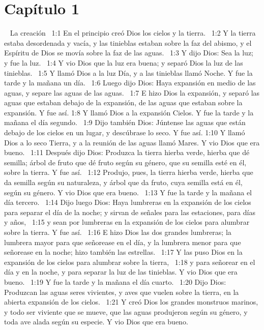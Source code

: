 \section*{Capítulo 1}





 
La creación  
1:1 En el principio creó Dios los cielos y la tierra.  
1:2 Y la tierra estaba desordenada y vacía, y las tinieblas estaban sobre la faz del abismo, y el Espíritu de Dios se movía sobre la faz de las aguas.  
1:3 Y dijo Dios: Sea la luz;  y fue la luz.  
1:4 Y vio Dios que la luz era buena; y separó Dios la luz de las tinieblas.  
1:5 Y llamó Dios a la luz Día, y a las tinieblas llamó Noche. Y fue la tarde y la mañana un día.  
1:6 Luego dijo Dios: Haya expansión en medio de las aguas, y separe las aguas de las aguas.  
1:7 E hizo Dios la expansión, y separó las aguas que estaban debajo de la expansión, de las aguas que estaban sobre la expansión. Y fue así. 
1:8 Y llamó Dios a la expansión Cielos. Y fue la tarde y la mañana el día segundo.  
1:9 Dijo también Dios: Júntense las aguas que están debajo de los cielos en un lugar, y descúbrase lo seco. Y fue así. 
1:10 Y llamó Dios a lo seco Tierra, y a la reunión de las aguas llamó Mares. Y vio Dios que era bueno.  
1:11 Después dijo Dios: Produzca la tierra hierba verde, hierba que dé semilla; árbol de fruto que dé fruto según su género, que su semilla esté en él, sobre la tierra. Y fue así.  
1:12 Produjo, pues, la tierra hierba verde, hierba que da semilla según su naturaleza, y árbol que da fruto, cuya semilla está en él, según su género. Y vio Dios que era bueno.  
1:13 Y fue la tarde y la mañana el día tercero.  
1:14 Dijo luego Dios: Haya lumbreras en la expansión de los cielos para separar el día de la noche; y sirvan de señales para las estaciones, para días y años,  
1:15 y sean por lumbreras en la expansión de los cielos para alumbrar sobre la tierra. Y fue así.  
1:16 E hizo Dios las dos grandes lumbreras; la lumbrera mayor para que señorease en el día, y la lumbrera menor para que señorease en la noche; hizo también las estrellas.  
1:17 Y las puso Dios en la expansión de los cielos para alumbrar sobre la tierra,  
1:18 y para señorear en el día y en la noche, y para separar la luz de las tinieblas. Y vio Dios que era bueno.  
1:19 Y fue la tarde y la mañana el día cuarto.  
1:20 Dijo Dios: Produzcan las aguas seres vivientes, y aves que vuelen sobre la tierra, en la abierta expansión de los cielos.  
1:21 Y creó Dios los grandes monstruos marinos, y todo ser viviente que se mueve, que las aguas produjeron según su género, y toda ave alada según su especie. Y vio Dios que era bueno.  
